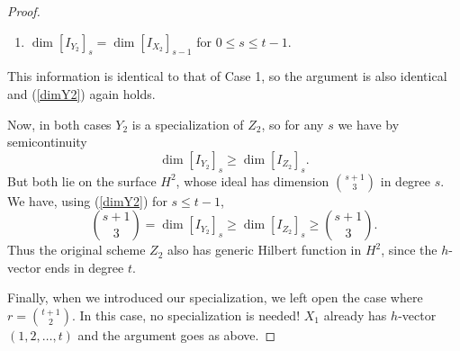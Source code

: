 \documentclass[10pt,a4paper]{amsart}
\begin{document}
\begin{proof}
\begin{enumerate}
    \item $\dim [I_{Y_2}]_s = \dim [I_{X_2}]_{s-1}$ for $0 \leq s \leq t-1$.
    
\end{enumerate}

This information is identical to that of Case 1, so the argument is also identical and (\ref{dimY2}) again holds.

Now, in both cases $Y_2$ is a specialization of $Z_2$, so for any $s$ we have by semicontinuity
\[
\dim [I_{Y_2}]_s \geq \dim [I_{Z_2}]_s .
\]
But both lie on the surface $H^2$, whose ideal has dimension $\binom{s+1}{3}$ in degree $s$. We have, using (\ref{dimY2}) for $s \leq t-1$, 
\[
\binom{s+1}{3} = \dim [I_{Y_2}]_s \geq \dim [I_{Z_2}]_s \geq \binom{s+1}{3}.
\]
Thus the original scheme $Z_2$ also has generic Hilbert function in $H^2$, since the $h$-vector ends in degree $t$.

Finally, when we introduced our specialization, we left open the case where $r = \binom{t+1}{2}$. In this case, no specialization is needed! $X_1$ already has $h$-vector $(1,2,\dots,t)$ and the argument goes as above.
\end{proof}
\end{document}

